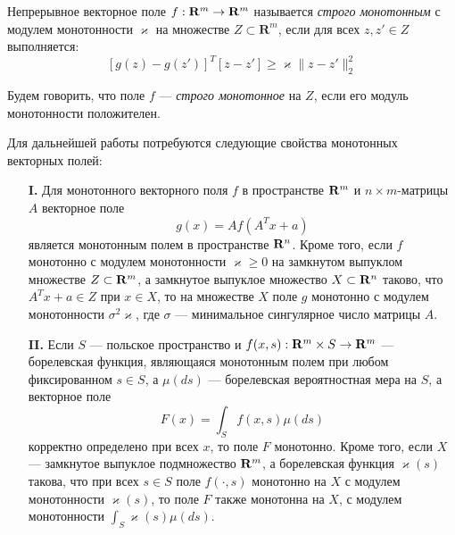 Непрерывное векторное поле $f: {\mathbf{R}}^m \to {\mathbf{R}}^m$ называется \emph{строго монотонным} с модулем монотонности $\varkappa$ на множестве $Z \subset \mathbf{R}^m$, если для всех $z, z' \in Z$ выполняется:
\begin{equation}
    \label{mon_mod}
    \left[g(z) - g(z')\right]^T\left[z - z'\right] \geqslant \varkappa \|z-z'\|_2^2
\end{equation}

Будем говорить, что поле $f$ --- \emph{строго монотонное} на $Z$, если его модуль монотонности положителен.

Для дальнейшей работы потребуются следующие свойства монотонных векторных полей:
\begin{enumerate}
    \item [\textbf{I.}] Для монотонного векторного поля $f$ в пространстве ${\mathbf{R}}^m$ и $n \times m$-матрицы $A$ векторное поле
    \begin{equation*}
        g(x) = Af(A^Tx + a)
    \end{equation*}
    является монотонным полем в пространстве ${\mathbf{R}}^n$. Кроме того, если $f$ монотонно с модулем монотонности $\varkappa \geqslant 0$ на замкнутом
    выпуклом множестве $Z \subset {\mathbf{R}}^m$, а замкнутое выпуклое множество $X \subset {\mathbf{R}}^n$ таково, что 
    $A^T x + a \in Z$ при $x\in X$, то на множестве $X$ поле $g$ монотонно с модулем монотонности $\sigma^2\varkappa$, где $\sigma$ --- минимальное
    сингулярное число матрицы $A$.
    
    \item [\textbf{II.}] Если $S$ --- польское пространство и $f(x, s): {\mathbf{R}}^m \times S \to {\mathbf{R}}^m$ --- борелевская функция, являющаяся монотонным полем при любом фиксированном $s \in S$, а $\mu(ds)$ --- борелевская вероятностная мера на $S$, а векторное поле
    \begin{equation}
        \label{vec_field_summ}
        F(x) = \int_S f(x,s) \mu(ds)
    \end{equation}
    корректно определено при всех $x$, то поле $F$ монотонно. Кроме того, если $X$ --- замкнутое выпуклое подмножество ${\mathbf{R}}^m$, а борелевская функция $\varkappa(s)$ такова, что при всех $s\in S$ поле $f(\cdot, s)$ монотонно на $X$ с модулем монотонности $\varkappa(s)$, то поле $F$ также монотонна на $X$, с модулем монотонности $\int_S \varkappa(s) \mu(ds)$.
    
\end{enumerate}